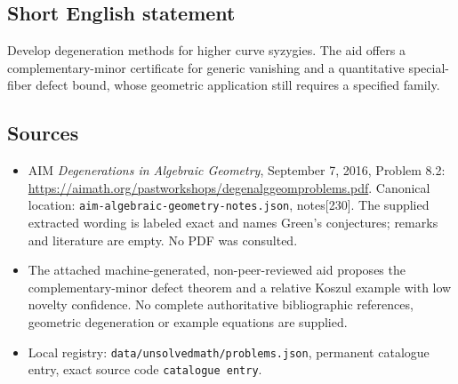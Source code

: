 \documentclass[11pt]{article}
\begin{document}
\subsection{Short English statement}
Develop degeneration methods for higher curve syzygies. The aid offers a complementary-minor certificate for generic vanishing and a quantitative special-fiber defect bound, whose geometric application still requires a specified family.
\subsection{Sources}
\begin{itemize}
\item AIM \emph{Degenerations in Algebraic Geometry}, September 7, 2016, Problem 8.2: \url{https://aimath.org/pastworkshops/degenalggeomproblems.pdf}. Canonical location: \texttt{aim-algebraic-geometry-notes.json}, notes[230]. The supplied extracted wording is labeled exact and names Green's conjectures; remarks and literature are empty. No PDF was consulted.
\item The attached machine-generated, non-peer-reviewed aid proposes the complementary-minor defect theorem and a relative Koszul example with low novelty confidence. No complete authoritative bibliographic references, geometric degeneration or example equations are supplied.
\item Local registry: \texttt{data/unsolvedmath/problems.json}, permanent catalogue entry, exact source code \texttt{catalogue entry}.
\end{itemize}
\end{document}
